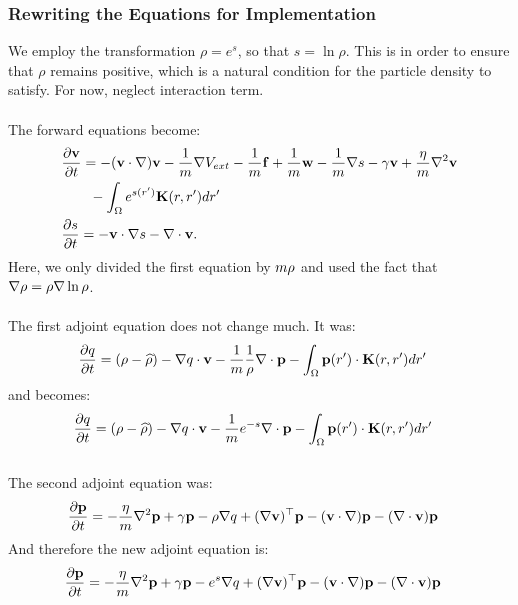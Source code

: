 \subsubsection{Rewriting the Equations for Implementation} \label{sec:INImplementation}
We employ the transformation $\rho = e^s$, so that $s = \ln \rho$. This is in order to ensure that $\rho$ remains positive, which is a natural condition for the particle density to satisfy. For now, neglect interaction term.
\\
\\
The forward equations become:
\begin{align}
& \frac{\partial \mathbf{v}}{\partial t}= -  (\mathbf{v} \cdot \nabla)\mathbf{v} - \frac{1}{m} \nabla V_{ext} -\frac{1}{m}\mathbf{f} +\frac{1}{m} \mathbf{w} - \frac{1}{m} \nabla s - \gamma \mathbf{v} +  \frac{\eta}{m} \nabla^2 \mathbf{v} \label{eqn:INreducedv1}\\
&\quad \quad  -\int_\Omega e^{s(r')} \mathbf{K}(r,r')dr'\\
 &\frac{\partial s}{\partial t} = - \mathbf{v} \cdot \nabla s - \nabla \cdot \mathbf{v} \label{eqn:INreducedrho1} .
\end{align}
Here, we only divided the first equation by $m \rho$ and used the fact that $\nabla \rho = \rho \nabla \ln \rho$.\\
\\
The first adjoint equation does not change much. It was: 
\begin{align*}
&  \frac{\partial q}{\partial t}  = (\rho - \widehat {\rho})- \nabla q \cdot \mathbf{v} -\frac{1}{m} \frac{1}{\rho}\nabla \cdot \mathbf{p} -  \int_\Omega  \mathbf{p}(r') \cdot\mathbf{K}(r,r')   dr' 
\end{align*}
and becomes:
\begin{align*}
&  \frac{\partial q}{\partial t}  = (\rho - \widehat {\rho})- \nabla q \cdot \mathbf{v}-\frac{1}{m} e^{-s}\nabla \cdot \mathbf{p}-  \int_\Omega  \mathbf{p}(r') \cdot\mathbf{K}(r,r')   dr' 
\end{align*}
\\
The second adjoint equation was:
\begin{align*}
&\frac{\partial \mathbf{p}}{\partial t} =  - \frac{\eta}{m} \nabla^2 \mathbf{p}  + \gamma\mathbf{p}-\rho\nabla q +(\nabla \mathbf{v})^\top\mathbf{p} 
- (\mathbf{v} \cdot \nabla)\mathbf{p} -  (\nabla \cdot \mathbf{v})\mathbf{p}   
\end{align*}
And therefore the new adjoint equation is:
\begin{align*}
&\frac{\partial \mathbf{p}}{\partial t} =  - \frac{\eta}{m} \nabla^2 \mathbf{p}  + \gamma\mathbf{p}-e^s\nabla q +(\nabla \mathbf{v})^\top\mathbf{p} 
- (\mathbf{v} \cdot \nabla)\mathbf{p} -  (\nabla \cdot \mathbf{v})\mathbf{p}   
\end{align*}

